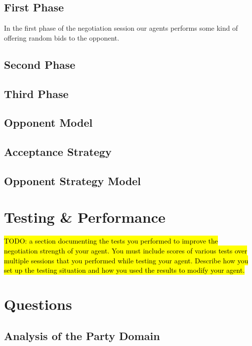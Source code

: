\documentclass[a4paper,10pt]{article}
\newcommand{\todo}[1] {\hl{TODO: #1}}
\begin{document}
\subsection{First Phase}
In the first phase of the negotiation session our agents performs some kind of offering random bids to the opponent.

\subsection{Second Phase}

\subsection{Third Phase}



\subsection{Opponent Model}
\label{sec:strategyOM}

\subsection{Acceptance Strategy}
\label{sec:strategyAS}

\subsection{Opponent Strategy Model}
\label{sec:strategyOMS}

\section{Testing \& Performance}
\label{sec:performance}
\todo{a section documenting the tests you performed to improve the negotiation strength of your agent. You must include scores of various tests over multiple sessions that you performed while testing your agent. Describe how you set up the testing situation and how you used the results to modify your agent.}

\section{Questions}
\label{sec:questions}

\subsection{Analysis of the Party Domain}
\end{document}
